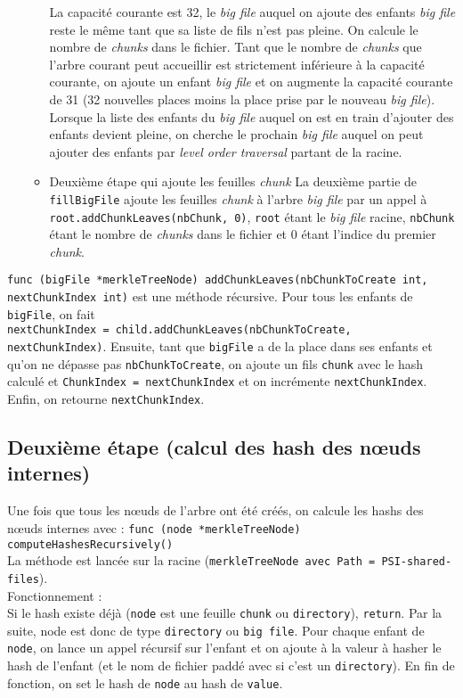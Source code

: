 \begin{itemize}
\begin{itemize}
                La capacité courante est 32, le \textit{big file} auquel on ajoute des enfants \textit{big file} reste le même tant que sa liste de fils n'est pas pleine. On calcule le nombre de \textit{chunks} dans le fichier.
                Tant que le nombre de \textit{chunks} que l'arbre courant peut accueillir est strictement inférieure à la capacité courante, on ajoute un enfant \textit{big file} et on augmente la capacité courante de 31 (32 nouvelles places moins la place prise par le nouveau \textit{big file}). Lorsque la liste des enfants du \textit{big file} auquel on est en train d'ajouter des enfants devient pleine, on cherche le prochain \textit{big file} auquel on peut ajouter des enfants par \textit{level order traversal} partant de la racine.
            \item Deuxième étape qui ajoute les feuilles \textit{chunk}
                La deuxième partie de \texttt{fillBigFile} ajoute les feuilles \textit{chunk} à l'arbre \textit{big file} par un appel à \texttt{root.addChunkLeaves(nbChunk, 0)}, \texttt{root} étant le \textit{big file} racine, \texttt{nbChunk} étant le nombre de \textit{chunks} dans le fichier et 0 étant l'indice du premier \textit{chunk}.
        \end{itemize}
\end{itemize}

\texttt{func (bigFile *merkleTreeNode) addChunkLeaves(nbChunkToCreate int, nextChunkIndex int)} est une méthode récursive.
Pour tous les enfants de \texttt{bigFile}, on fait \\ \texttt{nextChunkIndex = child.addChunkLeaves(nbChunkToCreate, nextChunkIndex)}.
Ensuite, tant que \texttt{bigFile} a de la place dans ses enfants et qu'on ne dépasse pas \texttt{nbChunkToCreate}, on ajoute un fils \texttt{chunk} avec le hash calculé et \texttt{ChunkIndex = nextChunkIndex} et on incrémente \texttt{nextChunkIndex}.
Enfin, on retourne \texttt{nextChunkIndex}.

\subsection{Deuxième étape (calcul des hash des nœuds internes)}
Une fois que tous les nœuds de l'arbre ont été créés, on calcule les hashs des nœuds internes avec :
\texttt{func (node *merkleTreeNode) computeHashesRecursively()} \\
La méthode est lancée sur la racine (\texttt{merkleTreeNode avec Path = PSI-shared-files}).\\
Fonctionnement :\\
Si le hash existe déjà (\texttt{node} est une feuille \texttt{chunk} ou \texttt{directory}), \texttt{return}.
Par la suite, node est donc de type \texttt{directory} ou \texttt{big file}.
Pour chaque enfant de \texttt{node}, on lance un appel récursif sur l'enfant et on ajoute à la valeur à hasher le hash de l'enfant (et le nom de fichier paddé avec \texttt{\0} si c'est un \texttt{directory}).
En fin de fonction, on set le hash de \texttt{node} au hash de \texttt{value}.

